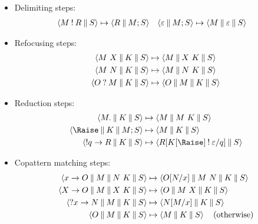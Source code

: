 \documentclass[sigplan,screen]{acmart}
\begin{document}
\begin{itemize}
\item Delimiting steps:
\begin{align*}
  \braket{M \ans R \cmid S}
  &\mapsto
  \braket{R \cmid M; S}
  &
  \braket{\varepsilon \cmid M; S}
  &\mapsto
  \braket{M \cmid \varepsilon \cmid S}
\end{align*}

\item Refocusing steps:
  \begin{align*}
  \braket{M ~ X \cmid K \cmid S}
  &\mapsto
  \braket{M \cmid X ~ K \cmid S}
  \\
  \braket{M ~ N \cmid K \cmid S}
  &\mapsto
  \braket{M \cmid N ~ K \cmid S}
  \\
  \braket{O \ask M \cmid K \cmid S}
  &\mapsto
  \braket{O \cmid M \cmid K \cmid S}
\end{align*}

\item Reduction steps:
  \begin{align*}
  \braket{M. \cmid K \cmid S}
  &\mapsto
  \braket{M \cmid M ~ K \cmid S}
  \\
  \braket{{\Raise} \cmid K \cmid M; S}
  &\mapsto
  \braket{M \cmid K \cmid S}
  \\
  \braket{\ans q \to R \cmid K \cmid S}
  &\mapsto
  \braket{R\subst{q}{K[\Raise]\ans\varepsilon} \cmid S}
\end{align*}

\item Copattern matching steps:
  \begin{align*}
  \braket{x \to O \cmid M \cmid N~K \cmid S}
  &\mapsto
  \braket{O\subst{x}{N} \cmid M~N \cmid K \cmid S}
  \\
  \braket{X \to O \cmid M \cmid X~K \cmid S}
  &\mapsto
  \braket{O \cmid M~X \cmid K \cmid S}
  \\
  \braket{\ask x \to N \cmid M \cmid K \cmid S}
  &\mapsto
  \braket{N\subst{x}{M} \cmid K \cmid S}
  \\
  \braket{O \cmid M \cmid K \cmid S}
  &\mapsto
  \braket{M \cmid K \cmid S}
  \quad(\text{otherwise})
\end{align*}
\end{itemize}
\end{document}
